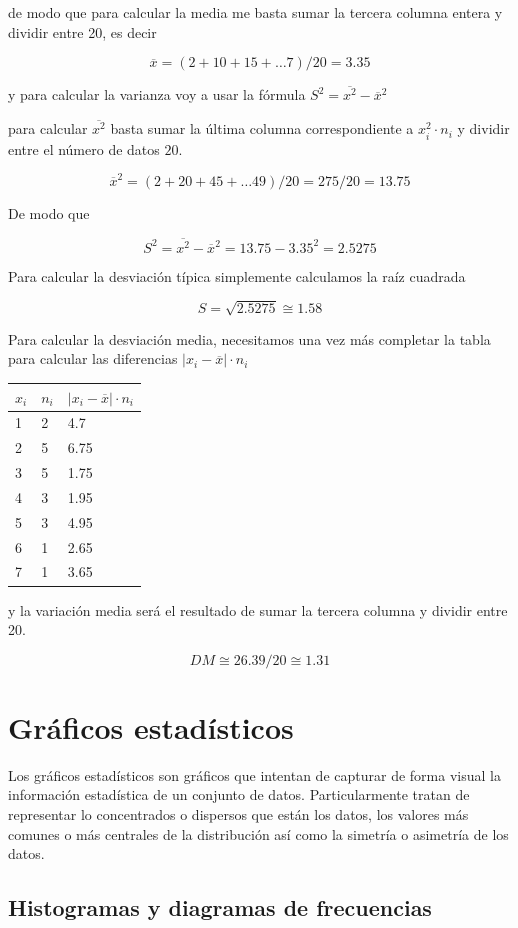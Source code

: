\documentclass[
]{article}
\begin{document}
de modo que para calcular la media me basta sumar la tercera columna
entera y dividir entre 20, es decir

\[\overline x = (2+10+15+\ldots 7)/20 = 3.35\]

y para calcular la varianza voy a usar la fórmula
\(S^2 = \overline{x^2} - \overline x^2\)

para calcular \(\overline{x^2}\) basta sumar la última columna
correspondiente a \(x_i^2 \cdot n_i\) y dividir entre el número de datos
\(20\).

\[\overline x^2 = (2+20+45+\ldots 49)/20 = 275/20 = 13.75\]

De modo que

\[S^2 =\overline{x^2} - \overline x^2 = 13.75-3.35^2 = 2.5275\]

Para calcular la desviación típica simplemente calculamos la raíz
cuadrada

\[S= \sqrt{2.5275} \cong 1.58\]

Para calcular la desviación media, necesitamos una vez más completar la
tabla para calcular las diferencias \(|x_i - \overline x|\cdot n_i\)

\begin{longtable}[]{@{}lll@{}}
\toprule
\(x_i\) & \(n_i\) & \(|x_i - \overline x|\cdot n_i\)\tabularnewline
\midrule
\endhead
1 & 2 & 4.7\tabularnewline
2 & 5 & 6.75\tabularnewline
3 & 5 & 1.75\tabularnewline
4 & 3 & 1.95\tabularnewline
5 & 3 & 4.95\tabularnewline
6 & 1 & 2.65\tabularnewline
7 & 1 & 3.65\tabularnewline
\bottomrule
\end{longtable}

y la variación media será el resultado de sumar la tercera columna y
dividir entre 20.

\[DM \cong 26.39/20\cong 1.31\]

\hypertarget{gruxe1ficos-estaduxedsticos}{%
\section{Gráficos estadísticos}\label{gruxe1ficos-estaduxedsticos}}

Los gráficos estadísticos son gráficos que intentan de capturar de forma
visual la información estadística de un conjunto de datos.
Particularmente tratan de representar lo concentrados o dispersos que
están los datos, los valores más comunes o más centrales de la
distribución así como la simetría o asimetría de los datos.

\hypertarget{histogramas-y-diagramas-de-frecuencias}{%
\subsection{Histogramas y diagramas de
frecuencias}\label{histogramas-y-diagramas-de-frecuencias}}
\end{document}
